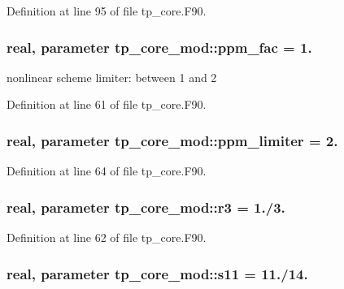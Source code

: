 Definition at line 95 of file tp\-\_\-core.\-F90.

\subsubsection[{ppm\-\_\-fac}]{\setlength{\rightskip}{0pt plus 5cm}real, parameter tp\-\_\-core\-\_\-mod\-::ppm\-\_\-fac = 1.\hspace{0.3cm}{\ttfamily [private]}}\label{classtp__core__mod_a39a84861aa5da93b744b78115c51961a}


nonlinear scheme limiter\-: between 1 and 2 



Definition at line 61 of file tp\-\_\-core.\-F90.

\subsubsection[{ppm\-\_\-limiter}]{\setlength{\rightskip}{0pt plus 5cm}real, parameter tp\-\_\-core\-\_\-mod\-::ppm\-\_\-limiter = 2.\hspace{0.3cm}{\ttfamily [private]}}\label{classtp__core__mod_a0b1f38c1d0fc65b85d98a3b12e8bde0a}


Definition at line 64 of file tp\-\_\-core.\-F90.

\subsubsection[{r3}]{\setlength{\rightskip}{0pt plus 5cm}real, parameter tp\-\_\-core\-\_\-mod\-::r3 = 1./3.\hspace{0.3cm}{\ttfamily [private]}}\label{classtp__core__mod_ac6e3f3772126b08884ee0df1afe3897d}


Definition at line 62 of file tp\-\_\-core.\-F90.

\subsubsection[{s11}]{\setlength{\rightskip}{0pt plus 5cm}real, parameter tp\-\_\-core\-\_\-mod\-::s11 = 11./14.\hspace{0.3cm}{\ttfamily [private]}}\label{classtp__core__mod_a01eb84f706485179c2638d9e625923b3}



